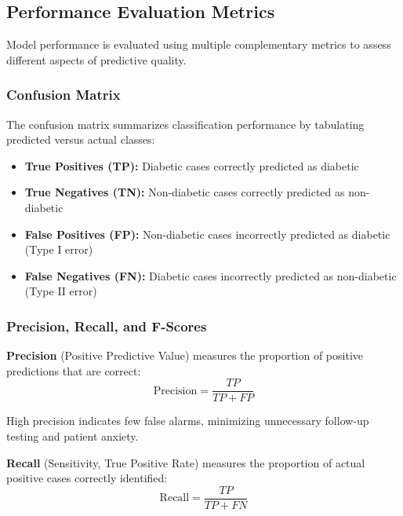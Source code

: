 \subsection{Performance Evaluation Metrics}

Model performance is evaluated using multiple complementary metrics to assess different aspects of predictive quality.

\subsubsection{Confusion Matrix}

The confusion matrix summarizes classification performance by tabulating predicted versus actual classes:

\begin{itemize}
    \item \textbf{True Positives (TP):} Diabetic cases correctly predicted as diabetic
    \item \textbf{True Negatives (TN):} Non-diabetic cases correctly predicted as non-diabetic
    \item \textbf{False Positives (FP):} Non-diabetic cases incorrectly predicted as diabetic (Type I error)
    \item \textbf{False Negatives (FN):} Diabetic cases incorrectly predicted as non-diabetic (Type II error)
\end{itemize}


\subsubsection{Precision, Recall, and F-Scores}

\textbf{Precision} (Positive Predictive Value) measures the proportion of positive predictions that are correct:
$$\mathrm{Precision} = \frac{TP}{TP + FP}$$

High precision indicates few false alarms, minimizing unnecessary follow-up testing and patient anxiety.

\textbf{Recall} (Sensitivity, True Positive Rate) measures the proportion of actual positive cases correctly identified:
$$\mathrm{Recall} = \frac{TP}{TP + FN}$$

